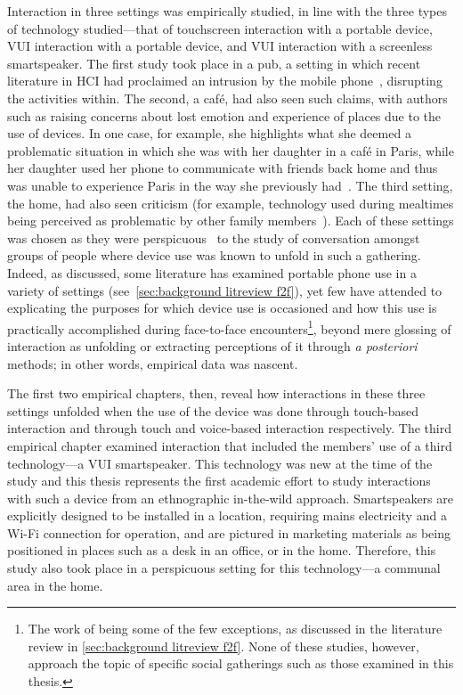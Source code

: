 \begin{revisedsubmission}
Interaction in three settings was empirically studied, in line with the three types of technology studied---that of touchscreen interaction with a portable device, \ac{VUI} interaction with a portable device, and \ac{VUI} interaction with a screenless smartspeaker.
The first study took place in a pub, a setting in which recent literature in \ac{HCI} had proclaimed an intrusion by the mobile phone~\citep{Su2015}, disrupting the activities within.
The second, a caf\'{e}, had also seen such claims, with authors such as \citet{Turkle2011} raising concerns about lost emotion and experience of places due to the use of devices.
In one case, for example, she highlights what she deemed a problematic situation in which she was with her daughter in a caf\'{e} in Paris, while her daughter used her phone to communicate with friends back home and thus was unable to experience Paris in the way she previously had~\citep[p. 156]{Turkle2011}.
The third setting, the home, had also seen criticism (for example, technology used during mealtimes being perceived as problematic by other family members~\citep{Rimer2009}).
Each of these settings was chosen as they were perspicuous~\citep[p. 181]{Garfinkel2002} to the study of conversation amongst groups of people where device use was known to unfold in such a gathering.
Indeed, as discussed, some literature has examined portable phone use in a variety of settings (see~\ref{sec:background litreview f2f}), yet few have attended to explicating the purposes for which device use is occasioned and how this use is practically accomplished during face-to-face encounters\footnote{The work of \citet{Brown2013,Brown2014,Pizza2016} being some of the few exceptions, as discussed in the literature review in \ref{sec:background litreview f2f}. None of these studies, however, approach the topic of specific social gatherings such as those examined in this thesis.}, beyond mere glossing of interaction as unfolding or extracting perceptions of it through \textit{a posteriori} methods; in other words, empirical data was nascent.

The first two empirical chapters, then, reveal how interactions in these three settings unfolded when the use of the device was done through touch-based interaction and through touch and voice-based interaction respectively. %
The third empirical chapter examined interaction that included the members' use of a third technology---a \ac{VUI} smartspeaker.
This technology was new at the time of the study and this thesis represents the first academic effort to study interactions with such a device from an ethnographic in-the-wild approach.
Smartspeakers are explicitly designed to be installed in a location, requiring mains electricity and a Wi-Fi connection for operation, and are pictured in marketing materials as being positioned in places such as a desk in an office, or in the home. 
Therefore, this study also took place in a perspicuous setting for this technology---a communal area in the home.


\end{revisedsubmission}
